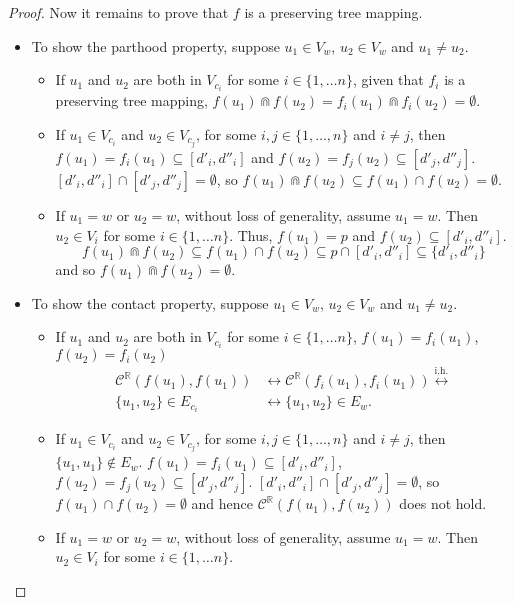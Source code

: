 \documentclass{article}
\newcommand{\R}{\mathbb{R}}
\newcommand{\bcap}{\Cap}
\newcommand{\bcont}{\mathcal{C}^\R}
\newcommand{\equivih}{\stackrel{\text{i.h.}}{\leftrightarrow}}
\begin{document}
\begin{proof}
  Now it remains to prove that $f$ is a preserving tree mapping.
  \begin{itemize}
  \item To show the parthood property, suppose $u_1 \in V_w$, $u_2 \in V_w$ and $u_1 \neq u_2$.
    \begin{itemize}
    \item If $u_1$ and $u_2$ are both in $V_{c_i}$ for some $i \in \{1, \dots n\}$, given that $f_i$ is a preserving tree mapping, $f(u_1) \bcap f(u_2) = f_i(u_1) \bcap f_i(u_2) = \emptyset$.
    \item If $u_1 \in V_{c_i}$ and $u_2 \in V_{c_j}$, for some $i, j \in \{1, \dots, n\}$ and $i \neq j$, then $f(u_1) = f_i(u_1) \subseteq [d'_i, d''_i]$ and $f(u_2) = f_j(u_2) \subseteq [d'_j, d''_j]$. $[d'_i, d''_i] \cap [d'_j, d''_j] = \emptyset$, so $f(u_1) \bcap f(u_2) \subseteq f(u_1) \cap f(u_2) = \emptyset$.
    \item If $u_1 = w$ or $u_2 = w$, without loss of generality, assume $u_1 = w$. Then $u_2 \in V_i$ for some $i \in \{1, \dots n\}$. Thus, $f(u_1) = p$ and $f(u_2) \subseteq [d'_i, d''_i]$.
      \begin{equation*}
        f(u_1) \bcap f(u_2) \subseteq f(u_1) \cap f(u_2) \subseteq p \cap [d'_i, d''_i] \subseteq \{d'_i, d''_i\}
      \end{equation*}
and so $f(u_1) \bcap f(u_2) = \emptyset$.
    \end{itemize}
  \item To show the contact property, suppose $u_1 \in V_w$, $u_2 \in V_w$ and $u_1 \neq u_2$.
    \begin{itemize}
    \item If $u_1$ and $u_2$ are both in $V_{c_i}$ for some $i \in \{1, \dots n\}$, $f(u_1) = f_i(u_1)$, $f(u_2) = f_i(u_2)$
      \begin{align*}
        \bcont(f(u_1), f(u_1)) &\leftrightarrow \bcont(f_i(u_1), f_i(u_1)) \equivih \\
        \{u_1, u_2\} \in E_{c_i} &\leftrightarrow \{u_1, u_2\} \in E_w.
      \end{align*}
    \item If $u_1 \in V_{c_i}$ and $u_2 \in V_{c_j}$, for some $i, j \in \{1, \dots, n\}$ and $i \neq j$, then $\{u_1, u_1\} \not \in E_w$. $f(u_1) = f_i(u_1) \subseteq [d'_i, d''_i]$, $f(u_2) = f_j(u_2) \subseteq [d'_j, d''_j]$. $[d'_i, d''_i] \cap [d'_j, d''_j] = \emptyset$, so $f(u_1) \cap f(u_2) = \emptyset$ and hence $\bcont(f(u_1), f(u_2))$ does not hold.
    \item If $u_1 = w$ or $u_2 = w$, without loss of generality, assume $u_1 = w$. Then $u_2 \in V_i$ for some $i \in \{1, \dots n\}$.

\end{itemize}
\end{itemize}
\end{proof}
\end{document}
